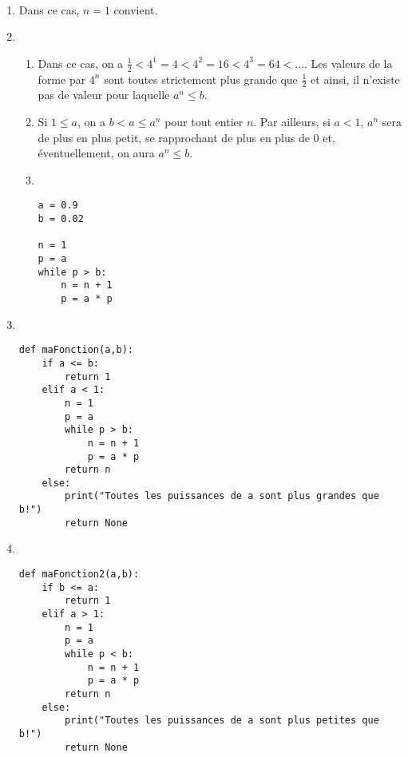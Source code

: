 \begin{correction}~
	\begin{enumerate}
		\item Dans ce cas, $n=1$ convient.
		\item \begin{enumerate}
		\item Dans ce cas, on a $\frac{1}{2}<4^1=4<4^2=16<4^3=64<...$. Les valeurs de la forme par $4^n$ sont toutes strictement plus grande que $\frac{1}{2}$ et ainsi, il n'existe pas de valeur pour laquelle $a^n\leq b$.
		\item Si $1\leq a$, on a $b<a\leq a^n$ pour tout entier $n$. Par ailleurs, si $a<1$, $a^n$ sera de plus en plus petit, se rapprochant de plus en plus de 0 et, éventuellement, on aura $a^n\leq b$.
		\item ~
\begin{center}
	\begin{varwidth}[t]{.5\textwidth}
		\begin{lstlisting}[language=iPython,linewidth = 4cm]
a = 0.9
b = 0.02

n = 1
p = a
while p > b:
    n = n + 1
    p = a * p
\end{lstlisting}\end{varwidth}\end{center}
\end{enumerate}
\item ~
\begin{center}
	\begin{varwidth}[t]{.5\textwidth}
		\begin{lstlisting}[language=iPython,linewidth = 12cm]
def maFonction(a,b):
	if a <= b:
		return 1
	elif a < 1:
		n = 1
		p = a
		while p > b:
		    n = n + 1
		    p = a * p
		return n
	else:
		print("Toutes les puissances de a sont plus grandes que b!")
		return None
\end{lstlisting}\end{varwidth}\end{center}
\item ~
\begin{center}
	\begin{varwidth}[t]{.5\textwidth}
		\begin{lstlisting}[language=iPython,linewidth = 12cm]
def maFonction2(a,b):
	if b <= a:
		return 1
	elif a > 1:
		n = 1
		p = a
		while p < b:
		    n = n + 1
		    p = a * p
		return n
	else:
		print("Toutes les puissances de a sont plus petites que b!")
		return None
\end{lstlisting}\end{varwidth}\end{center}
\end{enumerate}
\end{correction}



